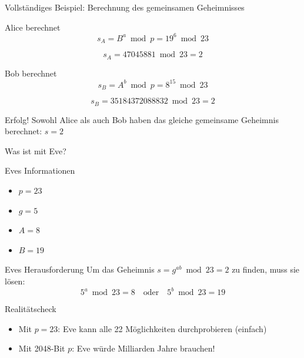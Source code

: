 \documentclass[handout]{beamer}
\begin{document}
\begin{frame}{Vollständiges Beispiel: Berechnung des gemeinsamen Geheimnisses}
\begin{block}{Alice berechnet}
\[
s_A = B^a \bmod p = 19^6 \bmod 23
\]

\pause

\[
s_A = 47045881 \bmod 23 = 2
\]
\end{block}

\pause

\begin{block}{Bob berechnet}
\[
s_B = A^b \bmod p = 8^{15} \bmod 23
\]

\pause

\[
s_B = 35184372088832 \bmod 23 = 2
\]
\end{block}

\pause

\begin{exampleblock}{Erfolg!}
Sowohl Alice als auch Bob haben das gleiche gemeinsame Geheimnis berechnet: $s = 2$
\end{exampleblock}
\end{frame}

\begin{frame}{Was ist mit Eve?}
\begin{block}{Eves Informationen}
\begin{itemize}
    \item $p = 23$
    \item $g = 5$
    \item $A = 8$
    \item $B = 19$
\end{itemize}
\end{block}

\pause

\begin{alertblock}{Eves Herausforderung}
Um das Geheimnis $s = g^{ab} \bmod 23 = 2$ zu finden, muss sie lösen:
\[
5^a \bmod 23 = 8 \quad \text{oder} \quad 5^b \bmod 23 = 19
\]
\end{alertblock}

\pause

\begin{block}{Realitätscheck}
\begin{itemize}
    \item Mit $p = 23$: Eve kann alle 22 Möglichkeiten durchprobieren (einfach)
    \item Mit 2048-Bit $p$: Eve würde Milliarden Jahre brauchen!
\end{itemize}
\end{block}
\end{frame}
\end{document}

